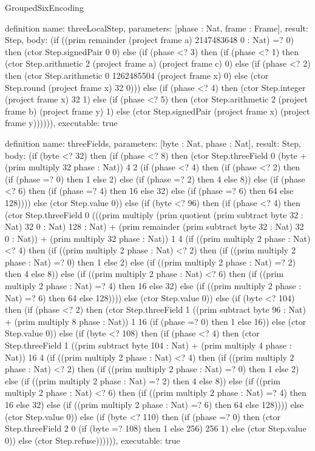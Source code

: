 \begin{lexlean}{GroupedSixEncoding}
\begin{semanticmodule}
definition{
  name: threeLocalStep,
  parameters: [phase : Nat, frame : Frame],
  result: Step,
  body: (if ((prim remainder (project frame a) 2147483648 0 : Nat) =? 0) then (ctor Step.signedPair 0 0) else (if (phase <? 3) then (if (phase <? 1) then (ctor Step.arithmetic 2 (project frame a) (project frame c) 0) else (if (phase <? 2) then (ctor Step.arithmetic 0 1262485504 (project frame x) 0) else (ctor Step.round (project frame x) 32 0))) else (if (phase <? 4) then (ctor Step.integer (project frame x) 32 1) else (if (phase <? 5) then (ctor Step.arithmetic 2 (project frame b) (project frame y) 1) else (ctor Step.signedPair (project frame x) (project frame y)))))),
  executable: true
}

definition{
  name: threeFields,
  parameters: [byte : Nat, phase : Nat],
  result: Step,
  body: (if (byte <? 32) then (if (phase <? 8) then (ctor Step.threeField 0 (byte + (prim multiply 32 phase : Nat)) 4 2 (if (phase <? 4) then (if (phase <? 2) then (if (phase =? 0) then 1 else 2) else (if (phase =? 2) then 4 else 8)) else (if (phase <? 6) then (if (phase =? 4) then 16 else 32) else (if (phase =? 6) then 64 else 128)))) else (ctor Step.value 0)) else (if (byte <? 96) then (if (phase <? 4) then (ctor Step.threeField 0 (((prim multiply (prim quotient (prim subtract byte 32 : Nat) 32 0 : Nat) 128 : Nat) + (prim remainder (prim subtract byte 32 : Nat) 32 0 : Nat)) + (prim multiply 32 phase : Nat)) 1 4 (if ((prim multiply 2 phase : Nat) <? 4) then (if ((prim multiply 2 phase : Nat) <? 2) then (if ((prim multiply 2 phase : Nat) =? 0) then 1 else 2) else (if ((prim multiply 2 phase : Nat) =? 2) then 4 else 8)) else (if ((prim multiply 2 phase : Nat) <? 6) then (if ((prim multiply 2 phase : Nat) =? 4) then 16 else 32) else (if ((prim multiply 2 phase : Nat) =? 6) then 64 else 128)))) else (ctor Step.value 0)) else (if (byte <? 104) then (if (phase <? 2) then (ctor Step.threeField 1 ((prim subtract byte 96 : Nat) + (prim multiply 8 phase : Nat)) 1 16 (if (phase =? 0) then 1 else 16)) else (ctor Step.value 0)) else (if (byte <? 108) then (if (phase <? 4) then (ctor Step.threeField 1 ((prim subtract byte 104 : Nat) + (prim multiply 4 phase : Nat)) 16 4 (if ((prim multiply 2 phase : Nat) <? 4) then (if ((prim multiply 2 phase : Nat) <? 2) then (if ((prim multiply 2 phase : Nat) =? 0) then 1 else 2) else (if ((prim multiply 2 phase : Nat) =? 2) then 4 else 8)) else (if ((prim multiply 2 phase : Nat) <? 6) then (if ((prim multiply 2 phase : Nat) =? 4) then 16 else 32) else (if ((prim multiply 2 phase : Nat) =? 6) then 64 else 128)))) else (ctor Step.value 0)) else (if (byte <? 110) then (if (phase =? 0) then (ctor Step.threeField 2 0 (if (byte =? 108) then 1 else 256) 256 1) else (ctor Step.value 0)) else (ctor Step.refuse)))))),
  executable: true
}


\end{semanticmodule}
\end{lexlean}
